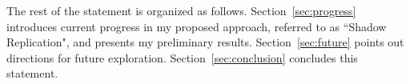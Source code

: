 The rest of the statement is organized as follows. Section~\ref{sec:progress} introduces current progress in my proposed approach, referred to as ``Shadow Replication", and presents my preliminary results. Section~\ref{sec:future} points out directions for future exploration. Section~\ref{sec:conclusion} concludes this statement.

